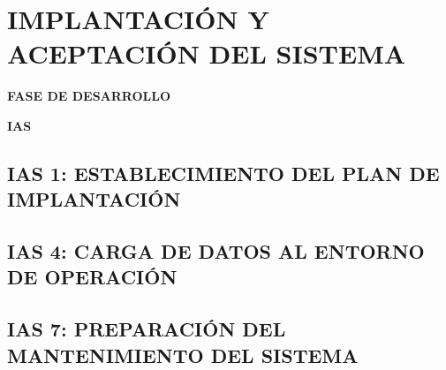 \newpage
\chapter{IMPLANTACIÓN Y ACEPTACIÓN DEL SISTEMA}
	\vspace{2cm}	
	\begin{center}
	{\Large \textbf{FASE DE DESARROLLO} \par}
	\end{center}
	\vspace{5cm}
	
	\begin{center}
	\Huge \textbf{IAS}\par
	\end{center}

\newpage

\section{IAS 1: ESTABLECIMIENTO DEL PLAN DE IMPLANTACIÓN}


\newpage
\section{IAS 4: CARGA DE DATOS AL ENTORNO DE OPERACIÓN}




\newpage
\section{IAS 7: PREPARACIÓN DEL MANTENIMIENTO DEL SISTEMA}


%
%
%
